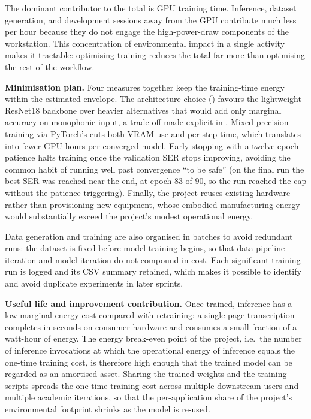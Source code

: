 The dominant contributor to the total is GPU training time.
Inference, dataset generation, and development sessions away from
the GPU contribute much less per hour because they do not engage
the high-power-draw components of the workstation.
This concentration of environmental impact in a single activity
makes it tractable: optimising training reduces the total far more
than optimising the rest of the workflow.

\textbf{Minimisation plan.}
Four measures together keep the training-time energy within the
estimated envelope.
The architecture choice () favours the
lightweight ResNet18 backbone over heavier alternatives that would add
only marginal accuracy on monophonic input, a trade-off made explicit
in .
Mixed-precision training via PyTorch's  cuts both VRAM
use and per-step time, which translates into fewer GPU-hours per
converged model.
Early stopping with a twelve-epoch patience halts training once the
validation SER stops improving, avoiding the common habit of running
well past convergence ``to be safe'' (on the final run the best SER
was reached near the end, at epoch 83 of 90, so the run reached the
cap without the patience triggering).
Finally, the project reuses existing hardware rather than provisioning
new equipment, whose embodied manufacturing energy would substantially
exceed the project's modest operational energy.

Data generation and training are also organised in batches to
avoid redundant runs: the dataset is fixed before model training
begins, so that data-pipeline iteration and model iteration do
not compound in cost.
Each significant training run is logged and its CSV summary
retained, which makes it possible to identify and avoid
duplicate experiments in later sprints.

\textbf{Useful life and improvement contribution.}
Once trained, inference has a low marginal energy cost compared
with retraining: a single page transcription completes in
seconds on consumer hardware and consumes a small fraction of a
watt-hour of energy.
The energy break-even point of the project, i.e.\ the number of
inference invocations at which the operational energy of inference
equals the one-time training cost, is therefore high enough that
the trained model can be regarded as an amortised asset.
Sharing the trained weights and the training scripts spreads the
one-time training cost across multiple downstream users and
multiple academic iterations, so that the per-application share
of the project's environmental footprint shrinks as the model is
re-used.

